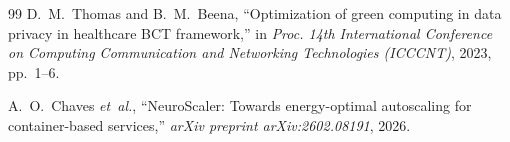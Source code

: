 \documentclass[12pt]{report}
\begin{document}
\begin{singlespace}
\begin{thebibliography}{99}
D.~M.~Thomas and B.~M.~Beena, ``Optimization of green computing in data privacy in healthcare BCT framework,'' in \emph{Proc. 14th International Conference on Computing Communication and Networking Technologies (ICCCNT)}, 2023, pp.~1--6.

A.~O.~Chaves \emph{et~al.}, ``NeuroScaler: Towards energy-optimal autoscaling for container-based services,'' \emph{arXiv preprint arXiv:2602.08191}, 2026.

\end{thebibliography}
\end{singlespace}
\end{document}
